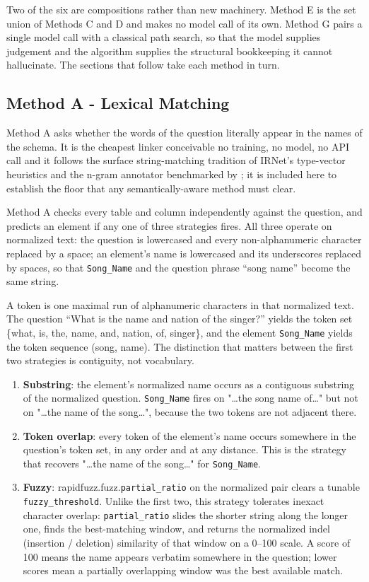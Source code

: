 Two of the six are compositions rather than new machinery. Method E is the set union of Methods C and D and makes no model call of its own. Method G pairs a single model call with a classical path search, so that the model supplies judgement and the algorithm supplies the structural bookkeeping it cannot hallucinate. The sections that follow take each method in turn.

\subsection{Method A - Lexical Matching}\label{sec:4-2-1}

Method A asks whether the words of the question literally appear in the names of the schema. It is the cheapest linker conceivable no training, no model, no API call and it follows the surface string-matching tradition of IRNet's type-vector heuristics \citep{guo2019} and the n-gram annotator benchmarked by \citet{lei2020}; it is included here to establish the floor that any semantically-aware method must clear.

Method A checks every table and column independently against the question, and predicts an element if any one of three strategies fires. All three operate on normalized text: the question is lowercased and every non-alphanumeric character replaced by a space; an element's name is lowercased and its underscores replaced by spaces, so that \texttt{Song\_Name} and the question phrase ``song name'' become the same string.

A token is one maximal run of alphanumeric characters in that normalized text. The question ``What is the name and nation of the singer?'' yields the token set \{what, is, the, name, and, nation, of, singer\}, and the element \texttt{Song\_Name} yields the token sequence (song, name). The distinction that matters between the first two strategies is contiguity, not vocabulary.

\begin{enumerate}
\def\labelenumi{\arabic{enumi}.}
\item
  \textbf{Substring}: the element's normalized name occurs as a contiguous substring of the normalized question. \texttt{Song\_Name} fires on "\ldots the song name of\ldots" but not on "\ldots the name of the song\ldots", because the two tokens are not adjacent there.
\item
  \textbf{Token overlap}: every token of the element's name occurs somewhere in the question's token set, in any order and at any distance. This is the strategy that recovers "\ldots the name of the song\ldots" for \texttt{Song\_Name}.
\item
  \textbf{Fuzzy}: rapidfuzz.fuzz.\texttt{partial\_ratio} on the normalized pair clears a tunable \texttt{fuzzy\_threshold}. Unlike the first two, this strategy tolerates inexact character overlap: \texttt{partial\_ratio} slides the shorter string along the longer one, finds the best-matching window, and returns the normalized indel (insertion / deletion) similarity of that window on a 0--100 scale. A score of 100 means the name appears verbatim somewhere in the question; lower scores mean a partially overlapping window was the best available match.
\end{enumerate}

